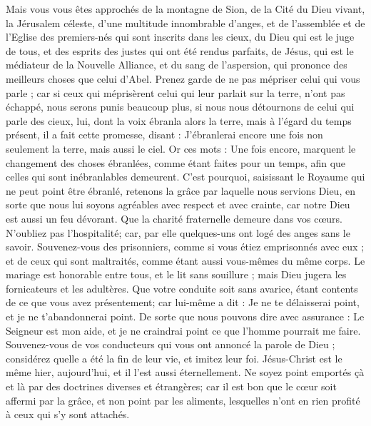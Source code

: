 \begin{multicols}{2}
Mais vous vous êtes approchés de la montagne de Sion, de la Cité du Dieu vivant, la Jérusalem céleste, d'une multitude innombrable d'anges,
et de l'assemblée et de l'Eglise des premiers-nés qui sont inscrits dans les cieux, du Dieu qui est le juge de tous, et des esprits des justes qui ont été rendus parfaits,
de Jésus, qui est le médiateur de la Nouvelle Alliance, et du sang de l'aspersion, qui prononce des meilleurs choses que celui d'Abel.
Prenez garde de ne pas mépriser celui qui vous parle ; car si ceux qui méprisèrent celui qui leur parlait sur la terre, n'ont pas échappé, nous serons punis beaucoup plus, si nous nous détournons de celui qui parle des cieux,
lui, dont la voix ébranla alors la terre, mais à l'égard du temps présent, il a fait cette promesse, disant : J'ébranlerai encore une fois non seulement la terre, mais aussi le ciel.
Or ces mots : Une fois encore, marquent le changement des choses ébranlées, comme étant faites pour un temps, afin que celles qui sont inébranlables demeurent.
C'est pourquoi, saisissant le Royaume qui ne peut point être ébranlé, retenons la grâce par laquelle nous servions Dieu, en sorte que nous lui soyons agréables avec respect et avec crainte,
car notre Dieu est aussi un feu dévorant.
\VerseOne{}Que la charité fraternelle demeure dans vos cœurs.
N'oubliez pas l'hospitalité; car, par elle quelques-uns ont logé des anges sans le savoir.
Souvenez-vous des prisonniers, comme si vous étiez emprisonnés avec eux ; et de ceux qui sont maltraités, comme étant aussi vous-mêmes du même corps.
Le mariage est honorable entre tous, et le lit sans souillure ; mais Dieu jugera les fornicateurs et les adultères.
Que votre conduite soit sans avarice, étant contents de ce que vous avez présentement; car lui-même a dit : Je ne te délaisserai point, et je ne t'abandonnerai point.
De sorte que nous pouvons dire avec assurance : Le Seigneur est mon aide, et je ne craindrai point ce que l'homme pourrait me faire.
Souvenez-vous de vos conducteurs qui vous ont annoncé la parole de Dieu ; considérez quelle a été la fin de leur vie, et imitez leur foi.
Jésus-Christ est le même hier, aujourd'hui, et il l'est aussi éternellement.
Ne soyez point emportés çà et là par des doctrines diverses et étrangères; car il est bon que le cœur soit affermi par la grâce, et non point par les aliments, lesquelles n'ont en rien profité à ceux qui s'y sont attachés.

\end{multicols}
